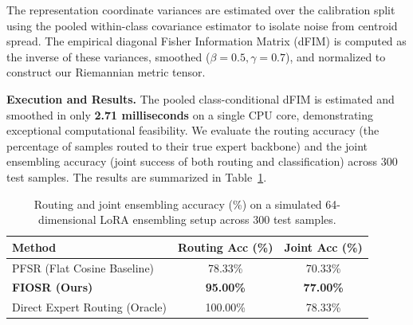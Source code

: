The representation coordinate variances are estimated over the calibration split using the pooled within-class covariance estimator to isolate noise from centroid spread. The empirical diagonal Fisher Information Matrix (dFIM) is computed as the inverse of these variances, smoothed ($\beta = 0.5, \gamma = 0.7$), and normalized to construct our Riemannian metric tensor.

\textbf{Execution and Results.} 
The pooled class-conditional dFIM is estimated and smoothed in only \textbf{2.71 milliseconds} on a single CPU core, demonstrating exceptional computational feasibility. We evaluate the routing accuracy (the percentage of samples routed to their true expert backbone) and the joint ensembling accuracy (joint success of both routing and classification) across $300$ test samples. The results are summarized in Table~\ref{tab:real_world_results}.

\begin{table}[h]
\caption{Routing and joint ensembling accuracy (\%) on a simulated 64-dimensional LoRA ensembling setup across 300 test samples.}
\label{tab:real_world_results}
\begin{center}
\begin{small}
\begin{sc}
\begin{tabular}{lcc}
\toprule
Method & Routing Acc (\%) & Joint Acc (\%) \\
\midrule
PFSR (Flat Cosine Baseline) & 78.33\% & 70.33\% \\
\textbf{FIOSR (Ours)} & \textbf{95.00\%} & \textbf{77.00\%} \\
\midrule
Direct Expert Routing (Oracle) & 100.00\% & 78.33\% \\
\bottomrule
\end{tabular}
\end{sc}
\end{small}
\end{center}
\end{table}


